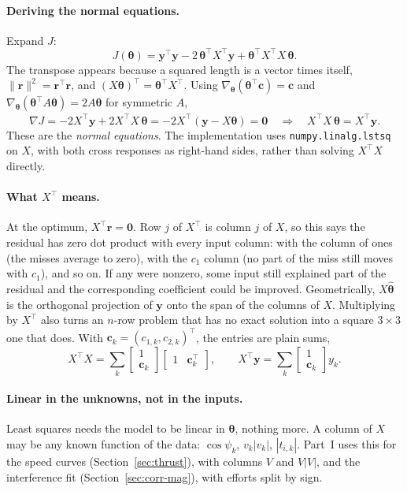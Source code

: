 \paragraph{Deriving the normal equations.} Expand $J$:
\[
  J(\bm\theta) = \bm y^\top\bm y - 2\,\bm\theta^\top X^\top\bm y + \bm\theta^\top X^\top X\,\bm\theta .
\]
The transpose appears because a squared length is a vector times itself,
$\|\bm r\|^2 = \bm r^\top\bm r$, and $(X\bm\theta)^\top = \bm\theta^\top X^\top$.
Using $\nabla_{\bm\theta}(\bm\theta^\top\bm c) = \bm c$ and
$\nabla_{\bm\theta}(\bm\theta^\top A\bm\theta) = 2A\bm\theta$ for symmetric $A$,
\[
  \nabla J = -2X^\top\bm y + 2X^\top X\,\bm\theta
           = -2X^\top(\bm y - X\bm\theta) = \bm 0
  \quad\Longrightarrow\quad
  X^\top X\,\hat{\bm\theta} = X^\top \bm{y}.
\]
These are the \emph{normal equations}. The implementation uses
\texttt{numpy.linalg.lstsq} on $X$, with both cross responses as right-hand
sides, rather than solving $X^\top X$ directly.

\paragraph{What $X^\top$ means.} At the optimum, $X^\top\bm r = \bm 0$. Row $j$ of
$X^\top$ is column $j$ of $X$, so this says the residual has zero dot product
with every input column: with the column of ones (the misses average to zero),
with the $c_1$ column (no part of the miss still moves with $c_1$), and so on.
If any were nonzero, some input still explained part of the residual and the
corresponding coefficient could be improved. Geometrically, $X\hat{\bm\theta}$
is the orthogonal projection of $\bm y$ onto the span of the columns of $X$.
Multiplying by $X^\top$ also turns an $n$-row problem that has no exact solution
into a square $3\times3$ one that does. With $\bm c_k=(c_{1,k},c_{2,k})^\top$, the entries are plain sums,
\[
  X^\top X = \sum_k \begin{bmatrix}1\\ \bm c_k\end{bmatrix}\begin{bmatrix}1 & \bm c_k^\top\end{bmatrix},
  \qquad
  X^\top\bm y = \sum_k \begin{bmatrix}1\\ \bm c_k\end{bmatrix} y_k.
\]

\paragraph{Linear in the unknowns, not in the inputs.} Least squares needs the
model to be linear in $\bm\theta$, nothing more. A column of $X$ may be any known
function of the data: $\cos\psi_k$, $v_k|v_k|$, $|t_{i,k}|$. Part~I uses this
for the speed curves (Section~\ref{sec:thrust}), with columns $V$ and
$V|V|$, and the interference fit (Section~\ref{sec:corr-mag}), with efforts
split by sign.

